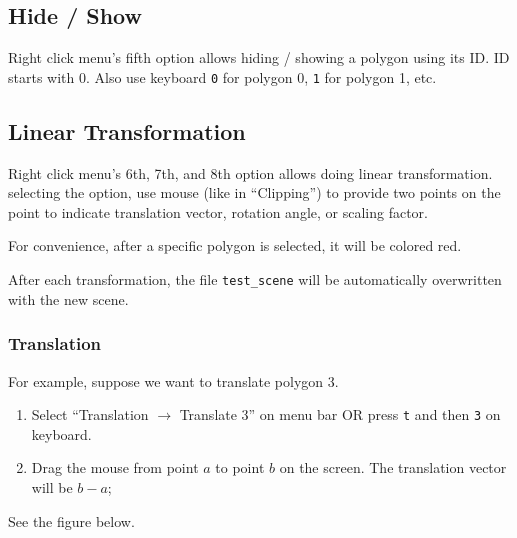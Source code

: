 \documentclass[11pt]{article}
\begin{document}
\subsection{Hide / Show}

Right click menu's fifth option allows hiding / showing a polygon using its ID. 
ID starts with 0. Also use keyboard \lstinline{0} for polygon 0, \lstinline{1}
for polygon 1, etc.

\subsection{Linear Transformation}

Right click menu's 6th, 7th, and 8th option allows doing linear transformation.
 selecting the option, use mouse (like in ``Clipping'') to provide two points
 on the point to indicate translation vector, rotation angle, or scaling factor.

For convenience, after a specific polygon is selected, it will be colored
 {\color{red}red}. 

After each transformation, the file \lstinline{test_scene} will be automatically
 overwritten with the new scene. 

\subsubsection{Translation}

For example, suppose we want to translate polygon 3. 

\begin{enumerate}
\item Select ``Translation $\to$ Translate 3'' on menu bar OR press
	\lstinline{t} and then \lstinline{3} on keyboard. 
\item Drag the mouse from point $a$ to point $b$ on the screen. The translation
	vector will be $b - a$; 
\end{enumerate}

See the figure below. 

\

\end{document}
